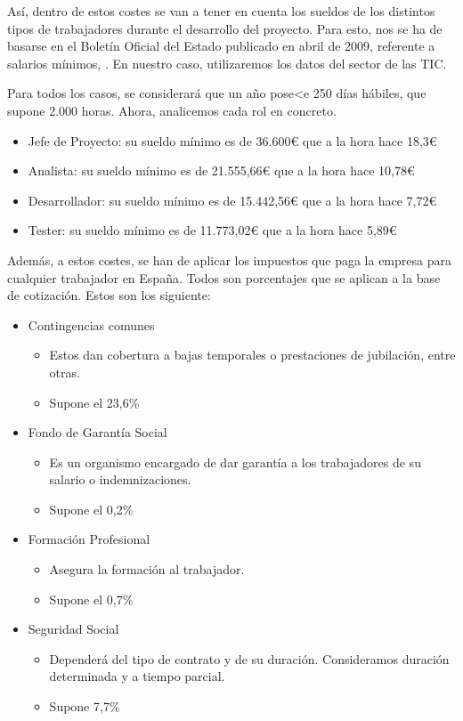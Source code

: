 Así, dentro de estos costes se van a tener en cuenta los sueldos de los distintos tipos de trabajadores durante el desarrollo del proyecto. Para esto, nos se ha de basarse en el Boletín Oficial del Estado publicado en abril de 2009, referente a salarios mínimos, \cite{boe_salarios}. En nuestro caso, utilizaremos los datos del sector de las TIC.

Para todos los casos, se considerará que un año pose<e 250 días hábiles, que supone 2.000 horas. Ahora, analicemos cada rol en concreto.

\begin{itemize}
    \item Jefe de Proyecto: su sueldo mínimo es de 36.600€ que a la hora hace 18,3€
    \item Analista: su sueldo mínimo es de 21.555,66€ que a la hora hace 10,78€
    \item Desarrollador: su sueldo mínimo es de 15.442,56€ que a la hora hace 7,72€
    \item Tester: su sueldo mínimo es de 11.773,02€ que a la hora hace 5,89€
\end{itemize}

Además, a estos costes, se han de aplicar los impuestos que paga la empresa para cualquier trabajador en España. Todos son porcentajes que se aplican a la base de cotización. Estos son los siguiente:
\begin{itemize}
    \item Contingencias comunes
    \begin{itemize}
        \item Estos dan cobertura a bajas temporales o prestaciones de jubilación, entre otras.
        \item Supone el 23,6\%
    \end{itemize}
    \item Fondo de Garantía Social
    \begin{itemize}
        \item Es un organismo encargado de dar garantía a los trabajadores de su salario o indemnizaciones.
        \item Supone el 0,2\%
    \end{itemize}
    \item Formación Profesional
    \begin{itemize}
        \item Asegura la formación al trabajador.
        \item Supone el 0,7\%
    \end{itemize}
    \item Seguridad Social
    \begin{itemize}
        \item Dependerá del tipo de contrato y de su duración. Consideramos duración determinada y a tiempo parcial.
        \item Supone 7,7\%
    \end{itemize}
\end{itemize}

